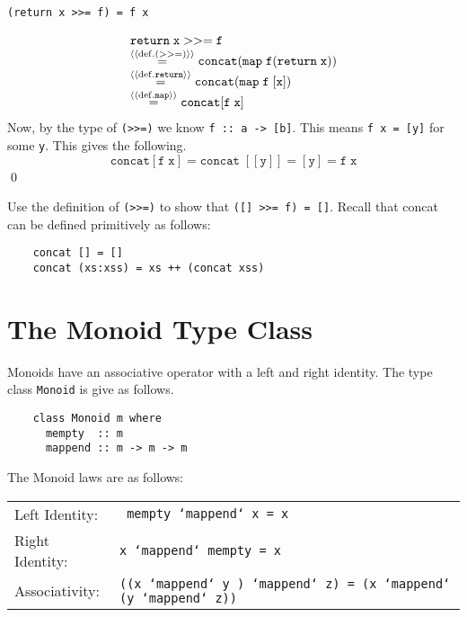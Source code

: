 \documentclass[11pt]{article}
\begin{document}
\begin{theorem}
{\tt{(return x >>= f) = f x}}
\end{theorem}
\Proof
\[\begin{array}{l}
{\mathtt{return \; x >>= f}}\\
  \stackrel{{\langle{{\langle{{\mathrm{def}}.(>>=)}\rangle}}\rangle}}{=} {\mathtt{concat (map \; f (return \; x))}}\\
  \stackrel{{\langle{{\langle{{\mathrm{def}}.{\mathtt{return}}}\rangle}}\rangle}}{=} {\mathtt{concat (map \; f\; [x])}} \\
  \stackrel{{\langle{{\langle{{\mathrm{def}}.{\mathtt{map}}}\rangle}}\rangle}}{=} {\mathtt{concat [f \; x]}}
\end{array}\]
Now, by the type of {\tt{(>>=)}} we know {\tt{f :: a -> [b]}}.  This means {\tt{f x = [y]}} for some {\tt{y}}. This gives the following.
\[
  {\mathtt{concat [f\; x]}} = {\mathtt{concat \; [[y]]}} = [{\mathtt{y}}] = {\mathtt{f \; x}}
\]
\qed


\begin{exercise}
Use the definition of {\tt{(>>=)}} to show that {\tt{([] >>= f) = []}}.
Recall that concat can be defined primitively as follows:
\begin{verbatim}
    concat [] = []
    concat (xs:xss) = xs ++ (concat xss)
\end{verbatim}
\end{exercise}

\section{The Monoid Type Class}

Monoids have an associative operator with a left and right identity. 
The type class {\tt{Monoid}} is give as follows.

\begin{verbatim}
    class Monoid m where 
      mempty  :: m
      mappend :: m -> m -> m
\end{verbatim}


\noindent{}The Monoid laws are as follows:\\


\begin{tabular}{ll}
Left Identity: & {\tt{ mempty `mappend` x =  x}} \\
Right Identity: & {\tt{x `mappend` mempty = x}} \\
Associativity: & {\tt{((x `mappend` y ) `mappend` z) = (x `mappend` (y `mappend` z))}} \\
\end{tabular}
\end{document}
